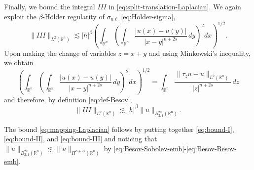 \documentclass{amsart}
\newcommand{\snl}{{\sigma_{n\ell}}}
\def\R{{\mathbb R}}
\theoremstyle{plain}
\numberwithin{equation}{section}
\numberwithin{table}{section}
\numberwithin{figure}{section}
\numberwithin{theorem}{section}
\numberwithin{corollary}{section}
\numberwithin{definition}{section}
\numberwithin{lemma}{section}
\numberwithin{proposition}{section}
\numberwithin{remark}{section}
\begin{document}
Finally, we bound the integral $III$ in \eqref{eq:split-translation-Laplacian}. We again exploit the $\beta$-H\"older regularity of $\snl$ \eqref{eq:Holder-sigma},
\[
\| III \|_{L^2(\R^n)}  \lesssim |h|^\beta \left( \int_{\R^n} \left( \int_{\R^n} \frac{|u(x) - u(y)|}{|x-y|^{n+2s}} \, dy \right)^2 dx \right)^{1/2} .
\]
Upon making the change of variables $z = x + y$ and using Minkowski's inequality, we obtain
\[
 \left( \int_{\R^n} \left( \int_{\R^n} \frac{|u(x) - u(y)|}{|x-y|^{n+2s}} \, dy \right)^2 dx \right)^{1/2} = \int_{\R^n} \frac{\| \tau_z u - u \|_{L^2(\R^n)}}{|z|^{n+2s}} \, dz
\] 
and therefore, by definition \eqref{eq:def-Besov},
\begin{equation} \label{eq:bound-III}
\| III \|_{L^2(\R^n)} \lesssim |h|^{\beta} \|  u \|_{B^{2s}_{2,1}(\R^n)}.
\end{equation}

The bound \eqref{eq:mapping-Laplacian} follows by putting together \eqref{eq:bound-I}, \eqref{eq:bound-II}, and \eqref{eq:bound-III} and noticing that $\|  u \|_{B^{2s}_{2,1}(\R^n)} \lesssim \|  u \|_{H^{\alpha+2s}(\R^n)}$ by \eqref{eq:Besov-Sobolev-emb}-\eqref{eq:Besov-Besov-emb}.




\end{document}
